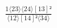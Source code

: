 \documentclass[varwidth, border=5pt]{standalone}
\begin{document}
\begin{my}
$\begin{gathered}
\scriptscriptstyle\frac{1⟨23⟩⟨24⟩[13]²}{⟨12⟩[14]²⟨34⟩}
\end{gathered}$
\end{my}
\end{document}
